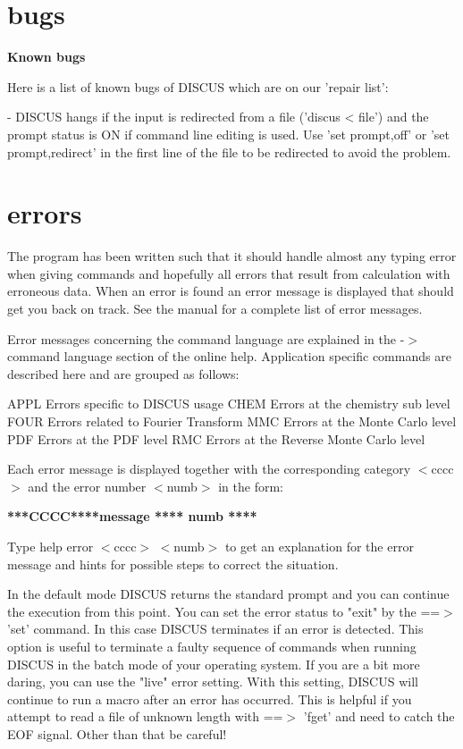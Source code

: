 \section{bugs}
{\bf Known bugs \par }
\par
\vspace{3pt}
Here is a list of known bugs of DISCUS which are on our 'repair 
list': 
\par
\begin{MacVerbatim}
- DISCUS hangs if the input is redirected from a file ('discus < file')
  and the prompt status is ON if command line editing is used.
  Use 'set prompt,off' or 'set prompt,redirect' in the first
  line of the file to be redirected to avoid the problem.
\end{MacVerbatim}
\section{errors}
\par
The program has been written such that it should handle almost 
any typing error when giving commands and hopefully all errors 
that result from calculation with erroneous data. When an error 
is found an error message is displayed that should get you back 
on track. See the manual for a complete list of error messages. 
\par
Error messages concerning the command language are explained in 
the -$> $ command language section of the online help. Application 
specific commands are described here and are grouped as follows: 
\par
\begin{MacVerbatim}
APPL   Errors specific to DISCUS usage
CHEM   Errors at the chemistry sub level
FOUR   Errors related to Fourier Transform
MMC    Errors at the Monte Carlo level
PDF    Errors at the PDF level
RMC    Errors at the Reverse Monte Carlo level
\end{MacVerbatim}
Each error message is displayed together with the corresponding 
category $ <$cccc$> $ and the error number $ <$numb$> $ in the form: 
\par
{\bf ****CCCC****message                    **** numb **** \par }
\par
\vspace{3pt}
Type 
help error $ <$cccc$> $ $ <$numb$> $ 
to get an explanation for the error message and hints for possible 
steps to correct the situation. 
\par
In the default mode DISCUS returns the standard prompt and you can 
continue the execution from this point. You can set the error status 
to "exit" by the ==$> $'set' command. In this case DISCUS terminates 
if an error is detected. This option is useful to terminate a faulty 
sequence of commands when running DISCUS in the batch mode of your 
operating system. 
If you are a bit more daring, you can use the "live" error setting. 
With this setting, DISCUS will continue to run a macro after an 
error has occurred. This is helpful if you attempt to read a file 
of unknown length with ==$> $ 'fget' and need to catch the EOF signal. 
Other than that be careful! 
\par
